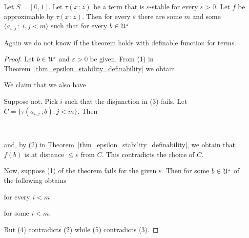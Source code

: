 \begin{theorem}
  Let $S=[0,1]$.
  Let $\tau(x\,;z)$ be a term that is $\varepsilon$-stable for every $\varepsilon>0$.
  Let $f$ be approximable by $\tau(x\,;z)$.
  Then for every $\varepsilon$ there are some $m$ and some $\langle a_{i,j}\ :\ i,j<m\rangle$ such that for every $b\in{\EuScript U}^z$\smallskip

  
\end{theorem}

Again we do not know if the theorem holds with definable function for terms.

\begin{proof}
  Let $b\in{\EuScript U}^z$ and $\varepsilon>0$ be given.
  From (1) in Theorem~\ref{thm_epsilon_stability_definability} we obtain


  We claim that we also have


  Suppose not.
  Pick $i$ such that the disjunction in (3) fails. 
  Let $C=\{\tau(a_{i,j}\,;b):j<m\}$.
  Then 

  \

  and, by (2) in Theorem~\ref{thm_epsilon_stability_definability}, we obtain that $f(b)$ is at distance $\le\varepsilon$ from $C$.
  This contradicts the choice of $C$. 

  
  

  Now, suppose (1) of the theorem fails for the given $\varepsilon$.
  Then for some $b\in{\EuScript U}^z$ of the following obtains

  \hfill for every $i<m$\phantom{.}

  \hfill for some $i<m$.

But (4) contradicts (2) while (5) contradicts (3).
\end{proof}


